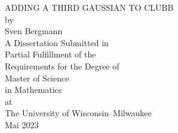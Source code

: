 \begin{center}
{\Large ADDING A THIRD GAUSSIAN TO CLUBB}
    \\
    \vspace{0.6\baselineskip}
    by\\
    Sven Bergmann\\
    \vspace{2in}
    A Dissertation Submitted in\\
    Partial Fulfillment of the\\
    Requirements for the Degree of\\
    \vspace{0.5in}
    Master of Science\\
    in Mathematics\\
    \vspace{0.5in}
    at\\
    The University of Wisconsin--Milwaukee\\
    Mai 2023\\
\end{center}